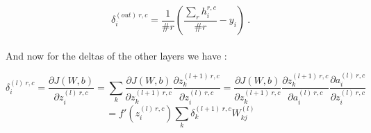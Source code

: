 \documentclass[a4paper,12pt,twoside]{article}
\begin{document}
\begin{equation}
\delta^{(out)~r,c}_i = \frac{1}{\# r}\left(\frac{\sum_r h_i^{r,c}}{\# r} - y_i \right)~.
\end{equation}
\\

And now for the deltas of the other layers we have :

\begin{equation}
\delta^{(l)~r,c}_i = \frac{\partial J(W,b)}{\partial z^{(l)~r,c}_i} = \sum_k \frac{\partial J(W,b)}{\partial z^{(l+1)~r,c}_k}\frac{\partial z^{(l+1)~r,c}_k}{\partial z^{(l)~r,c}_i} = \frac{\partial J(W,b)}{\partial z^{(l+1)~r,c}_k}\frac{\partial z^{(l+1)~r,c}_k}{\partial a^{(l)~r,c}_i} \frac{\partial a^{(l)~r,c}_i}{\partial z^{(l)~r,c}_i} 
\end{equation}
\[
= f'(z^{(l)~r,c}_i) \sum_k \delta^{(l+1)~r,c}_k W^{(l)}_{kj}
\]
\end{document}

